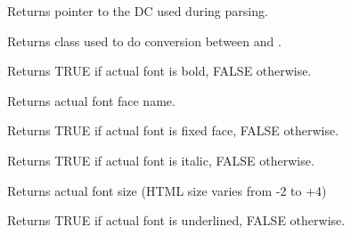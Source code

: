 \label{wxhtmlwinparsergetdc}


Returns pointer to the DC used during parsing.


\label{wxhtmlwinparsergetencodingconverter}


Returns  class used
to do conversion between 
and .

\label{wxhtmlwinparsergetfontbold}


Returns TRUE if actual font is bold, FALSE otherwise.

\label{wxhtmlwinparsergetfontface}


Returns actual font face name.


\label{wxhtmlwinparsergetfontfixed}


Returns TRUE if actual font is fixed face, FALSE otherwise.

\label{wxhtmlwinparsergetfontitalic}


Returns TRUE if actual font is italic, FALSE otherwise.


\label{wxhtmlwinparsergetfontsize}


Returns actual font size (HTML size varies from -2 to +4)

\label{wxhtmlwinparsergetfontunderlined}


Returns TRUE if actual font is underlined, FALSE otherwise.

\label{wxhtmlwinparsergetinputencoding}

